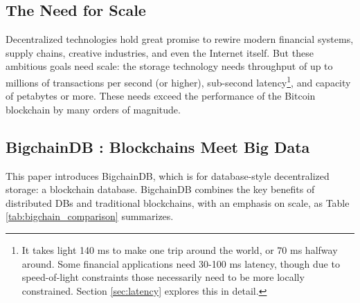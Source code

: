 \subsection{The Need for Scale}
Decentralized technologies hold great promise to rewire modern financial systems, supply chains, creative industries, and even the Internet itself.
But these ambitious goals need scale: the storage technology needs throughput of up to millions of transactions per second (or higher), sub-second latency\footnote{It takes light 140 ms to make one trip around the world, or 70 ms halfway around. Some financial applications need 30-100 ms latency, though due to speed-of-light constraints those necessarily need to be more locally constrained. Section \ref{sec:latency} explores this in detail.}, and capacity of petabytes or more.
These needs exceed the performance of the Bitcoin blockchain by many orders of magnitude.

\subsection{BigchainDB : Blockchains Meet Big Data}
This paper introduces BigchainDB, which is for database-style decentralized storage: a blockchain database.
BigchainDB combines the key benefits of distributed DBs and traditional blockchains, with an emphasis on scale, as Table \ref{tab:bigchain_comparison} summarizes.

